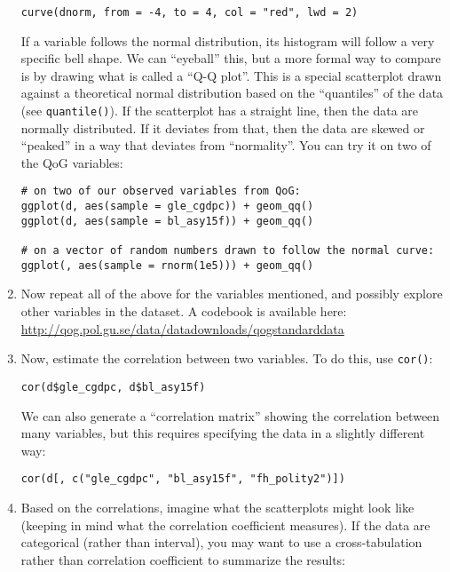 \documentclass[a4paper,12pt]{article}
\begin{document}
\begin{enumerate}
\begin{verbatim}
curve(dnorm, from = -4, to = 4, col = "red", lwd = 2)
\end{verbatim}


If a variable follows the normal distribution, its histogram will follow a very specific bell shape. We can ``eyeball'' this, but a more formal way to compare is by drawing what is called a ``Q-Q plot''. This is a special scatterplot drawn against a theoretical normal distribution based on the ``quantiles'' of the data (see \texttt{quantile()}). If the scatterplot has a straight line, then the data are normally distributed. If it deviates from that, then the data are skewed or ``peaked'' in a way that deviates from ``normality''. You can try it on two of the QoG variables:

\begin{verbatim}
# on two of our observed variables from QoG:
ggplot(d, aes(sample = gle_cgdpc)) + geom_qq()
ggplot(d, aes(sample = bl_asy15f)) + geom_qq()

# on a vector of random numbers drawn to follow the normal curve:
ggplot(, aes(sample = rnorm(1e5))) + geom_qq()
\end{verbatim}

\item Now repeat all of the above for the variables mentioned, and possibly explore other variables in the dataset. A codebook is available here: \url{http://qog.pol.gu.se/data/datadownloads/qogstandarddata}

\item Now, estimate the correlation between two variables. To do this, use \texttt{cor()}:

\begin{verbatim}
cor(d$gle_cgdpc, d$bl_asy15f)
\end{verbatim}

\noindent We can also generate a ``correlation matrix'' showing the correlation between many variables, but this requires specifying the data in a slightly different way:

\begin{verbatim}
cor(d[, c("gle_cgdpc", "bl_asy15f", "fh_polity2")])
\end{verbatim}

\item Based on the correlations, imagine what the scatterplots might look like (keeping in mind what the correlation coefficient measures). If the data are categorical (rather than interval), you may want to use a cross-tabulation rather than correlation coefficient to summarize the results:


\end{enumerate}
\end{document}

